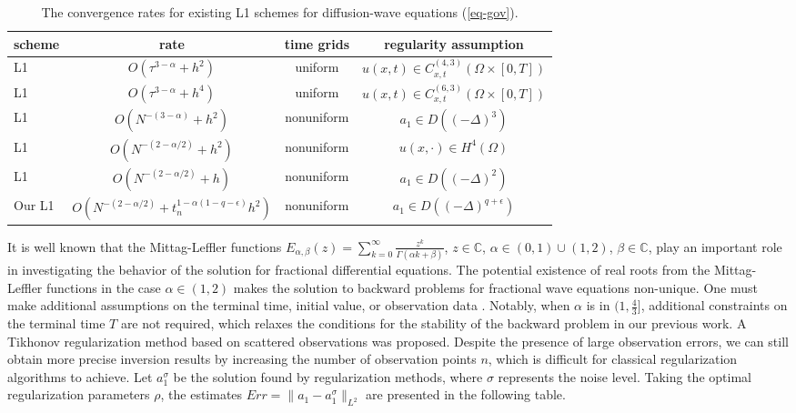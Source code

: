 \documentclass[11pt]{article}
\numberwithin{equation}{section}
\begin{document}
\begin{table}[!ht]\label{REF-method}
\caption{The convergence rates for existing L1 schemes for diffusion-wave equations (\ref{eq-gov}).}
\renewcommand{\arraystretch}{1.25}
\def\temptablewidth{1\textwidth}
\begin{center}
 \begin{tabular*}{\temptablewidth}{@{\extracolsep{\fill}}lccc}\hline
 scheme       & rate              &time grids      &regularity assumption     \\ \hline
 L1 \cite{Sun2006ANM}          & $O(\tau^{3-\alpha}+h^2)$       &uniform        &$u(x,t)\in C^{(4,3)}_{x,t}(\Omega\times[0,T])$                   \\ \hline
L1 \cite{Zhang2012SIAM}          & $O(\tau^{3-\alpha}+h^4)$       &uniform        &$u(x,t)\in C^{(6,3)}_{x,t}(\Omega\times[0,T])$                   \\ \hline
L1 \cite{Shen2021}            & $O(N^{-(3-\alpha)}+h^2)$    &nonuniform        &$a_1\in D((-\Delta)^{3})$                   \\ \hline
L1 \cite{LyuP2022SFOR}         & $O(N^{-(2-\alpha/2)}+h^2)$    &nonuniform        &$u(x,\cdot)\in H^{4}(\Omega)$                   \\ \hline
L1 \cite{An2022}              & $O(N^{-(2-\alpha/2)}+h)$     &nonuniform    &$a_1\in D((-\Delta)^{2})$                  \\ \hline
Our L1  & $O(N^{-(2-\alpha/2)}+t_n^{1-\alpha(1-q-\epsilon)}h^2)$ & nonuniform & $a_1\in D((-\Delta)^{q+\epsilon})$ \\ \hline
\end{tabular*}
\end{center}
\end{table}

It is well known that the Mittag-Leffler functions $E_{\alpha,\beta}(z)=\sum_{k=0}^\infty\frac{z^k}{\Gamma{(\alpha k+\beta)}}$, $z\in \mathbb{C}$, $\alpha\in(0,1)\cup(1,2)$, $\beta\in \mathbb{C}$, play an important role in investigating the behavior of the solution for fractional differential equations. The potential existence of real roots from the Mittag-Leffler functions in the case $\alpha\in(1,2)$ makes the solution to backward problems for fractional wave equations non-unique. One must make additional assumptions on the terminal time, initial value, or observation data \cite{Wen2023solving,WenJ2023backward,Zhang2022backward,Wei2018backward,floridia2020backward}. 
Notably, when $\alpha$ is in $(1,\frac43]$, additional constraints on
the terminal time $T$ are not required, which relaxes the conditions for the stability
of the backward problem in our previous work. 
A Tikhonov regularization method based on scattered observations was proposed. Despite the presence of large observation errors, we can still obtain more precise inversion results by increasing the number of observation points $n$, which is difficult for classical regularization algorithms to achieve. Let $a_1^\sigma$ be the solution found by regularization methods, where $\sigma$ represents the noise level. Taking the optimal regularization parameters $\rho$, the estimates $Err=\|a_1-a_1^\sigma\|_{L^2}$ are presented in the following table. 
\end{document}
